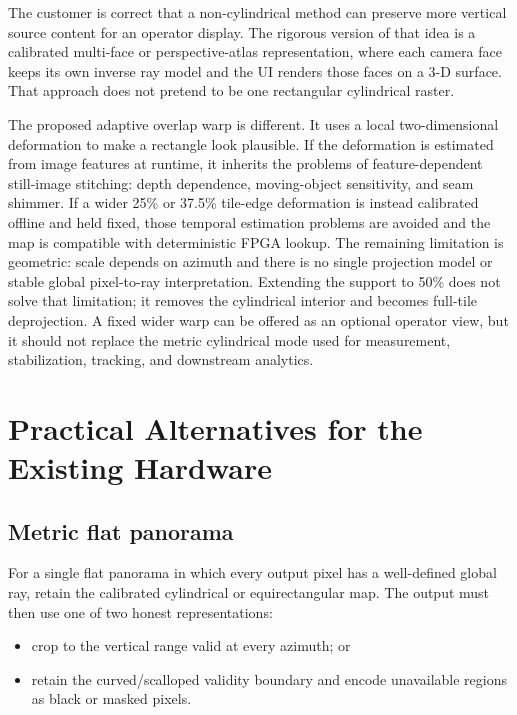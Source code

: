 \documentclass[10pt]{article}
\begin{document}
The customer is correct that a non-cylindrical method can preserve more vertical source content for an operator display. The rigorous version of that idea is a calibrated multi-face or perspective-atlas representation, where each camera face keeps its own inverse ray model and the UI renders those faces on a 3-D surface. That approach does not pretend to be one rectangular cylindrical raster.

The proposed adaptive overlap warp is different. It uses a local two-dimensional deformation to make a rectangle look plausible. If the deformation is estimated from image features at runtime, it inherits the problems of feature-dependent still-image stitching: depth dependence, moving-object sensitivity, and seam shimmer. If a wider 25\% or 37.5\% tile-edge deformation is instead calibrated offline and held fixed, those temporal estimation problems are avoided and the map is compatible with deterministic FPGA lookup. The remaining limitation is geometric: scale depends on azimuth and there is no single projection model or stable global pixel-to-ray interpretation. Extending the support to 50\% does not solve that limitation; it removes the cylindrical interior and becomes full-tile deprojection. A fixed wider warp can be offered as an optional operator view, but it should not replace the metric cylindrical mode used for measurement, stabilization, tracking, and downstream analytics.

\section{Practical Alternatives for the Existing Hardware}

\subsection{Metric flat panorama}

For a single flat panorama in which every output pixel has a well-defined global ray, retain the calibrated cylindrical or equirectangular map. The output must then use one of two honest representations:

\begin{itemize}
  \item crop to the vertical range valid at every azimuth; or
  \item retain the curved/scalloped validity boundary and encode unavailable regions as black or masked pixels.
\end{itemize}
\end{document}
